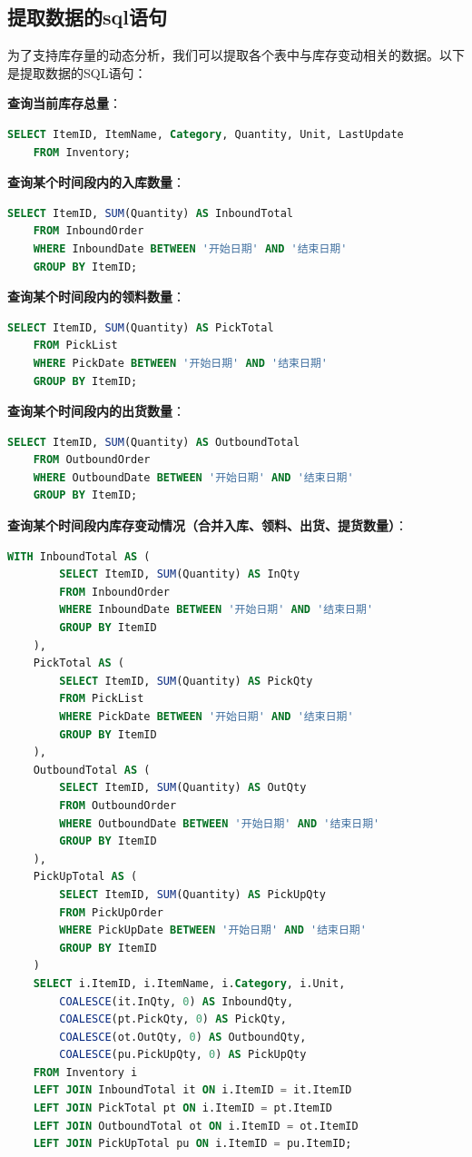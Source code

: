 \documentclass[12pt,a4paper]{article}
\begin{document}
\clearpage
\subsection{提取数据的sql语句}
为了支持库存量的动态分析，我们可以提取各个表中与库存变动相关的数据。以下是提取数据的SQL语句：

\textbf{查询当前库存总量}：
\begin{lstlisting}[language={SQL}]
    SELECT ItemID, ItemName, Category, Quantity, Unit, LastUpdate
    FROM Inventory; 
\end{lstlisting}

\textbf{查询某个时间段内的入库数量}：
\begin{lstlisting}[language={SQL}]
    SELECT ItemID, SUM(Quantity) AS InboundTotal
    FROM InboundOrder
    WHERE InboundDate BETWEEN '开始日期' AND '结束日期'
    GROUP BY ItemID;
\end{lstlisting}

\textbf{查询某个时间段内的领料数量}：
\begin{lstlisting}[language={SQL}]
    SELECT ItemID, SUM(Quantity) AS PickTotal
    FROM PickList
    WHERE PickDate BETWEEN '开始日期' AND '结束日期'
    GROUP BY ItemID;    
\end{lstlisting}

\textbf{查询某个时间段内的出货数量}：
\begin{lstlisting}[language={SQL}]
    SELECT ItemID, SUM(Quantity) AS OutboundTotal
    FROM OutboundOrder
    WHERE OutboundDate BETWEEN '开始日期' AND '结束日期'
    GROUP BY ItemID;       
\end{lstlisting}

\textbf{查询某个时间段内库存变动情况（合并入库、领料、出货、提货数量）}：
\begin{lstlisting}[language={SQL}]
    WITH InboundTotal AS (
        SELECT ItemID, SUM(Quantity) AS InQty
        FROM InboundOrder
        WHERE InboundDate BETWEEN '开始日期' AND '结束日期'
        GROUP BY ItemID
    ),
    PickTotal AS (
        SELECT ItemID, SUM(Quantity) AS PickQty
        FROM PickList
        WHERE PickDate BETWEEN '开始日期' AND '结束日期'
        GROUP BY ItemID
    ),
    OutboundTotal AS (
        SELECT ItemID, SUM(Quantity) AS OutQty
        FROM OutboundOrder
        WHERE OutboundDate BETWEEN '开始日期' AND '结束日期'
        GROUP BY ItemID
    ),
    PickUpTotal AS (
        SELECT ItemID, SUM(Quantity) AS PickUpQty
        FROM PickUpOrder
        WHERE PickUpDate BETWEEN '开始日期' AND '结束日期'
        GROUP BY ItemID
    )
    SELECT i.ItemID, i.ItemName, i.Category, i.Unit,
        COALESCE(it.InQty, 0) AS InboundQty,
        COALESCE(pt.PickQty, 0) AS PickQty,
        COALESCE(ot.OutQty, 0) AS OutboundQty,
        COALESCE(pu.PickUpQty, 0) AS PickUpQty
    FROM Inventory i
    LEFT JOIN InboundTotal it ON i.ItemID = it.ItemID
    LEFT JOIN PickTotal pt ON i.ItemID = pt.ItemID
    LEFT JOIN OutboundTotal ot ON i.ItemID = ot.ItemID
    LEFT JOIN PickUpTotal pu ON i.ItemID = pu.ItemID;          
\end{lstlisting}
\end{document}
